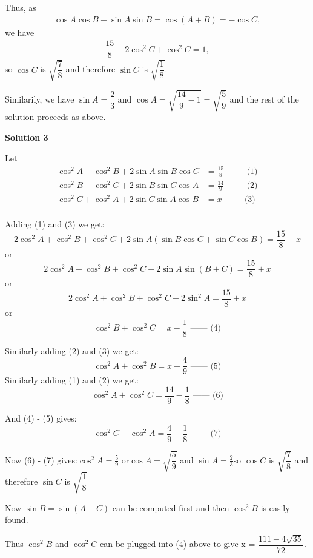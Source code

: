 \begin{enumerate}
 
Thus, as 
 \begin{align*} \cos A\cos B-\sin A\sin B=\cos (A+B)=-\cos C ,\end{align*}
 we have 
 \begin{align*} \dfrac{15}{8}-2\cos^2 C +\cos^2 C=1,  \end{align*}
 so $\cos C$ is $\sqrt{\dfrac{7}{8}}$ and therefore $\sin C$ is $\sqrt{\dfrac{1}{8}}$. 

 Similarily, we have $\sin A =\dfrac{2}{3}$ and $\cos A=\sqrt{\dfrac{14}{9}-1}=\sqrt{\dfrac{5}{9}}$ and the rest of the solution proceeds as above.

 



\textbf{Solution 3}

Let 
 \begin{align*} \cos^2 A + \cos^2 B + 2 \sin A \sin B \cos C &= \frac{15}{8} \text{     ------ (1)}\\ \cos^2 B + \cos^2 C + 2 \sin B \sin C \cos A &= \frac{14}{9} \text{     ------ (2)}\\ \cos^2 C + \cos^2 A + 2 \sin C \sin A \cos B &= x \text{                        ------ (3)}\\ \end{align*}


 Adding (1) and (3) we get:
 \[2 \cos^2 A + \cos^2 B + \cos^2 C + 2 \sin A( \sin B \cos C +  \sin C \cos B)  = \frac{15}{8} + x\]   or
 \[2 \cos^2 A + \cos^2 B + \cos^2 C + 2 \sin A \sin (B+C)  = \frac{15}{8} + x\]    or
 \[2 \cos^2 A + \cos^2 B + \cos^2 C + 2 \sin ^2 A = \frac{15}{8} + x\]    or
 \[\cos^2 B + \cos^2 C =  x - \frac{1}{8}     \text{     ------ (4)}\]

 Similarly adding (2) and (3) we get:
 \[\cos^2 A + \cos^2 B =  x - \frac{4}{9}     \text{     ------ (5)}\]Similarly adding (1) and (2) we get:
 \[\cos^2 A + \cos^2 C =  \frac{14}{9}  - \frac{1}{8}     \text{     ------ (6)}\]

 And (4) - (5) gives:
 \[\cos^2 C - \cos^2 A =  \frac{4}{9}  - \frac{1}{8}    \text{     ------ (7)}\]

 Now (6) - (7) gives:$\cos^2 A  =  \frac{5}{9}$ or$\cos A = \sqrt{\dfrac{5}{9}}$ and $\sin A = \frac{2}{3}$so $\cos C$ is $\sqrt{\dfrac{7}{8}}$ and therefore $\sin C$ is $\sqrt{\dfrac{1}{8}}$

 Now $\sin B = \sin(A+C)$ can be computed first and then $\cos^2 B$ is easily found.

 Thus $\cos^2 B$ and $\cos^2 C$ can be plugged into (4) above to give x =  $\dfrac{111-4\sqrt{35}}{72}$.


\end{enumerate}
